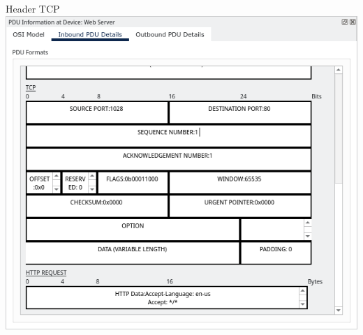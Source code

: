 \documentclass{article}
\begin{document}
\begin{flushleft}
        Header TCP \newline
        \includegraphics[scale=0.5]{3-mac-frame-tcp.png}
    \end{flushleft}
\end{document}
